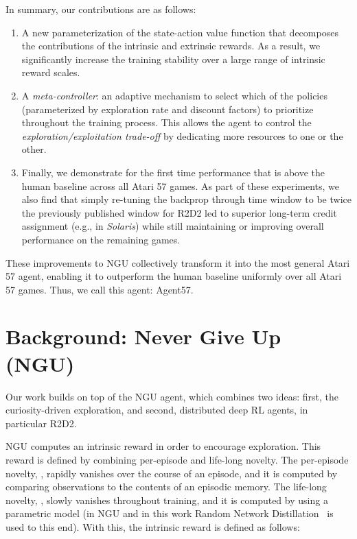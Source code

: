 \documentclass{article}
\begin{document}
In summary, our contributions are as follows:
\begin{enumerate}[leftmargin=12pt, align=left, labelwidth=10pt,  labelsep=0pt]
    \item A new parameterization of the state-action value function that decomposes the contributions of the intrinsic and extrinsic rewards. As a result, we significantly increase the training stability over a large range of intrinsic reward scales.
    \item A \emph{meta-controller}: an adaptive mechanism to select which of the policies (parameterized by exploration rate and discount factors) to prioritize throughout the training process. This allows the agent to control the \textit{exploration/exploitation trade-off} by dedicating more resources to one or the other.
    \item Finally, we demonstrate for the first time performance that is above the human baseline across all Atari 57 games. As part of these experiments, we also find that simply re-tuning the backprop through time window to be twice the previously published window for R2D2 led to superior long-term credit assignment (e.g., in \textit{Solaris}) while still maintaining or improving overall performance on the remaining games.
\end{enumerate}

These improvements to NGU collectively transform it into the most general Atari 57 agent, enabling it to outperform the human baseline uniformly over all Atari 57 games. Thus, we call this agent: Agent57.

\section{Background: Never Give Up (NGU)}
\label{sec:background}
Our work builds on top of the NGU agent, which combines two ideas: first, the curiosity-driven exploration, and second, distributed deep RL agents, in particular R2D2.

NGU computes an intrinsic reward in order to encourage exploration. This reward is defined by combining per-episode and life-long novelty. The per-episode novelty, , rapidly vanishes over the course of an episode, and it is computed by comparing observations to the contents of an episodic memory. The life-long novelty, , slowly vanishes throughout training, and it is computed by using a parametric model (in NGU and in this work Random Network Distillation~\citep{burda2018exploration} is used to this end). With this, the intrinsic reward  is defined as follows:
\end{document}
